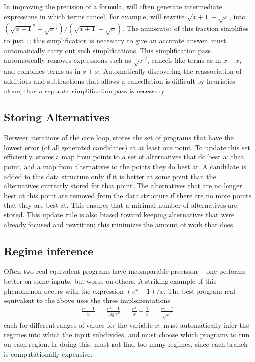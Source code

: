 \documentclass[paper.tex]{subfiles}
\begin{document}
In improving the precision of a formula,
  \casio will often generate intermediate expressions in which terms cancel.
For example, \casio will rewrite $\sqrt{x+1} - \sqrt{x}$,
  into $(\sqrt{x+1}^2 - \sqrt{x}^2) / (\sqrt{x+1} + \sqrt{x})$.
The numerator of this fraction simplifies to just $1$;
  this simplification is necessary to give an accurate answer.
\casio must automatically carry out such simplifications.
This simplification pass automatically
  removes expressions such as $\sqrt{x}^2$,
  cancels like terms as in $x - x$,
  and combines terms as in $x + x$.
Automatically discovering
  the reassociation of additions and subtractions that allows a cancellation
  is difficult by heuristics alone;
  thus a separate simplification pass is necessary.

\subsection{Storing Alternatives}

Between iterations of the core loop,
  \casio stores the set of programs
  that have the lowest error (of all generated candidates)
  at at least one point.
To update this set efficiently, \casio stores
  a map from points to a set of alternatives that do best at that point,
  and a map from alternatives to the points they do best at.
A candidate is added to this data structure
  only if it is better at some point
  than the alternatives currently stored for that point.
The alternatives that are no longer best at this point
  are removed from the data structure
  if there are no more points that they are best at.
This ensures that a minimal number of alternatives are stored.
This update rule is also biased toward keeping alternatives
  that were already focused and rewritten;
  this minimizes the amount of work that \casio does.

\subsection{Regime inference}

Often two real-equivalent programs have incomparable precision---%
  one performs better on some inputs, but worse on others.
A striking example of this phenomenon occurs with the expression $(e^x - 1) / x$.
The best program real-equivalent to the above
  uses the three implementations
\begin{align*}
  \frac{e^x - 1}{x} && \frac{e^x - 1}{\log e^x} &&
  \frac{e^x}{x} - \frac1x && \frac{e^x - 1}{\sqrt{x}^2} 
\end{align*}
  each for different ranges of values for the variable $x$.
\casio must automatically infer the regimes
  into which the input subdivides,
  and must choose which programs to run on each region.
In doing this, \casio must not find too many regimes,
  since each branch is computationally expensive.
\end{document}
